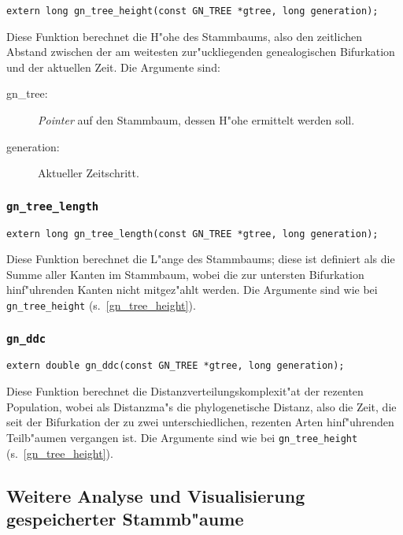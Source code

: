 \documentclass[a4paper, fleqn]{article}
\begin{document}
\begin{verbatim}
extern long gn_tree_height(const GN_TREE *gtree, long generation);
\end{verbatim}

Diese Funktion berechnet die H"ohe des Stammbaums, also den zeitlichen Abstand
zwischen der am weitesten zur"uckliegenden genealogischen Bifurkation und
der aktuellen Zeit. Die Argumente sind:

\begin{description}

\item[gn\_tree:] \textsl{Pointer} auf den Stammbaum, dessen H"ohe ermittelt werden
    soll.

\item[generation:] Aktueller Zeitschritt.

\end{description}


\subsubsection{\texttt{gn\_tree\_length}}
\label{gn_tree_length}

\begin{verbatim}
extern long gn_tree_length(const GN_TREE *gtree, long generation);
\end{verbatim}

Diese Funktion berechnet die L"ange des Stammbaums; diese ist definiert als
die Summe aller Kanten im Stammbaum, wobei die zur untersten Bifurkation
hinf"uhrenden Kanten nicht mitgez"ahlt werden. Die Argumente sind wie bei
\verb|gn_tree_height| (s.\ \ref{gn_tree_height}).


\subsubsection{\texttt{gn\_ddc}}
\label{gn_ddc}

\begin{verbatim}
extern double gn_ddc(const GN_TREE *gtree, long generation);
\end{verbatim}

Diese Funktion berechnet die Distanzverteilungskomplexit"at der rezenten
Population, wobei als Distanzma"s die phylogenetische Distanz, also die
Zeit, die seit der Bifurkation der zu zwei unterschiedlichen, rezenten Arten
hinf"uhrenden Teilb"aumen vergangen ist. Die Argumente sind wie bei
\verb|gn_tree_height| (s.\ \ref{gn_tree_height}).

\subsection{Weitere Analyse und Visualisierung gespeicherter Stammb"aume}
\end{document}
